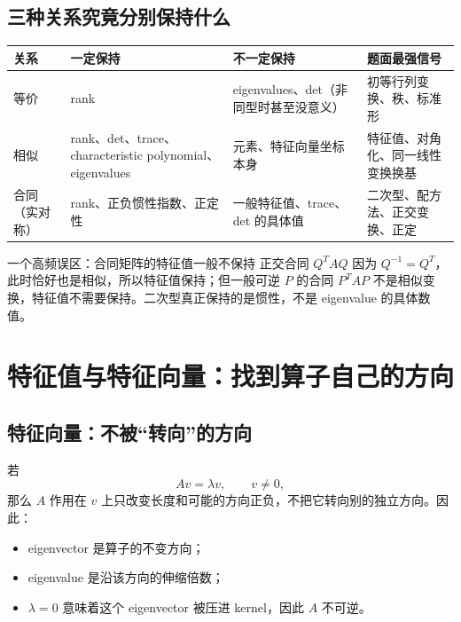 \documentclass[11pt,a4paper,openany]{ctexbook}
\begin{document}
\begin{center}
\end{center}

\section{三种关系究竟分别保持什么}
\begin{longtable}{L{2.2cm}L{3.7cm}L{3.4cm}L{\dimexpr\linewidth-9.97cm\relax}}
\toprule
\textbf{关系} & \textbf{一定保持} & \textbf{不一定保持} & \textbf{题面最强信号}\\
\midrule
等价 & rank & eigenvalues、det（非同型时甚至没意义） & 初等行列变换、秩、标准形\\
相似 & rank、det、trace、characteristic polynomial、eigenvalues & 元素、特征向量坐标本身 & 特征值、对角化、同一线性变换换基\\
合同（实对称） & rank、正负惯性指数、正定性 & 一般特征值、trace、det 的具体值 & 二次型、配方法、正交变换、正定\\
\bottomrule
\end{longtable}

\begin{warnbox}{一个高频误区：合同矩阵的特征值一般不保持}
正交合同 $Q^TAQ$ 因为 $Q^{-1}=Q^T$，此时恰好也是相似，所以特征值保持；但一般可逆 $P$ 的合同 $P^TAP$ 不是相似变换，特征值不需要保持。二次型真正保持的是惯性，不是 eigenvalue 的具体数值。
\end{warnbox}

\chapter{特征值与特征向量：找到算子自己的方向}

\section{特征向量：不被“转向”的方向}
若
\[
Av=\lambda v,\qquad v\neq0,
\]
那么 $A$ 作用在 $v$ 上只改变长度和可能的方向正负，不把它转向别的独立方向。因此：
\begin{itemize}
  \item eigenvector 是算子的不变方向；
  \item eigenvalue 是沿该方向的伸缩倍数；
  \item $\lambda=0$ 意味着这个 eigenvector 被压进 kernel，因此 $A$ 不可逆。
\end{itemize}
\end{document}
